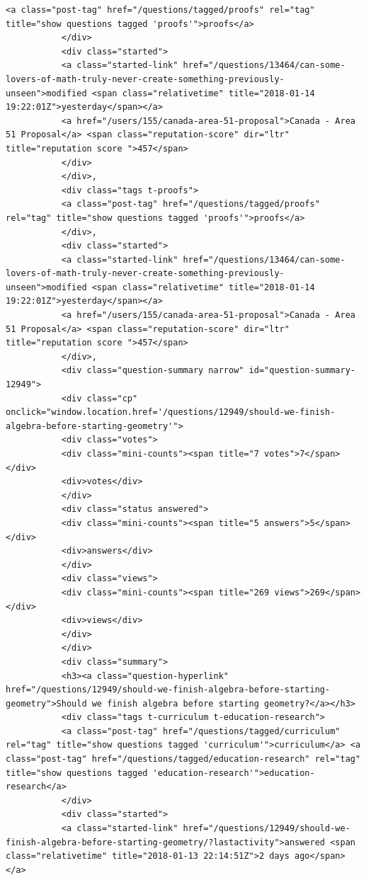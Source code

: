 \documentclass[11pt]{article}
\begin{document}
\begin{Verbatim}[commandchars=\\\{\}]
           <a class="post-tag" href="/questions/tagged/proofs" rel="tag" title="show questions tagged 'proofs'">proofs</a>
           </div>
           <div class="started">
           <a class="started-link" href="/questions/13464/can-some-lovers-of-math-truly-never-create-something-previously-unseen">modified <span class="relativetime" title="2018-01-14 19:22:01Z">yesterday</span></a>
           <a href="/users/155/canada-area-51-proposal">Canada - Area 51 Proposal</a> <span class="reputation-score" dir="ltr" title="reputation score ">457</span>
           </div>
           </div>,
           <div class="tags t-proofs">
           <a class="post-tag" href="/questions/tagged/proofs" rel="tag" title="show questions tagged 'proofs'">proofs</a>
           </div>,
           <div class="started">
           <a class="started-link" href="/questions/13464/can-some-lovers-of-math-truly-never-create-something-previously-unseen">modified <span class="relativetime" title="2018-01-14 19:22:01Z">yesterday</span></a>
           <a href="/users/155/canada-area-51-proposal">Canada - Area 51 Proposal</a> <span class="reputation-score" dir="ltr" title="reputation score ">457</span>
           </div>,
           <div class="question-summary narrow" id="question-summary-12949">
           <div class="cp" onclick="window.location.href='/questions/12949/should-we-finish-algebra-before-starting-geometry'">
           <div class="votes">
           <div class="mini-counts"><span title="7 votes">7</span></div>
           <div>votes</div>
           </div>
           <div class="status answered">
           <div class="mini-counts"><span title="5 answers">5</span></div>
           <div>answers</div>
           </div>
           <div class="views">
           <div class="mini-counts"><span title="269 views">269</span></div>
           <div>views</div>
           </div>
           </div>
           <div class="summary">
           <h3><a class="question-hyperlink" href="/questions/12949/should-we-finish-algebra-before-starting-geometry">Should we finish algebra before starting geometry?</a></h3>
           <div class="tags t-curriculum t-education-research">
           <a class="post-tag" href="/questions/tagged/curriculum" rel="tag" title="show questions tagged 'curriculum'">curriculum</a> <a class="post-tag" href="/questions/tagged/education-research" rel="tag" title="show questions tagged 'education-research'">education-research</a>
           </div>
           <div class="started">
           <a class="started-link" href="/questions/12949/should-we-finish-algebra-before-starting-geometry/?lastactivity">answered <span class="relativetime" title="2018-01-13 22:14:51Z">2 days ago</span></a>

\end{Verbatim}
\end{document}
